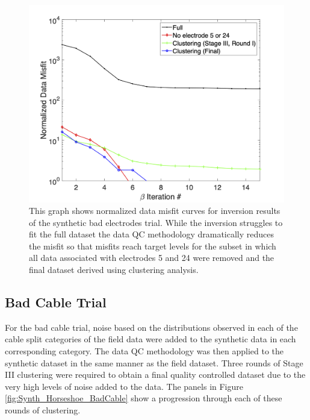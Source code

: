 \documentclass[final,authoryear,5p,times,twocolumn]{elsarticle}
\begin{document}
\begin{figure} [!ht]
	\begin{center}
	\includegraphics[trim=1.3cm 0.2cm 2.6cm 1.2cm, clip=true,width=0.75\linewidth]{./Figures/Fig22.png}
	\end{center}
\caption{This graph shows normalized data misfit curves for inversion results of the synthetic bad electrodes trial. While the inversion struggles to fit the full dataset the data QC methodology dramatically reduces the misfit so that misfits reach target levels for the subset in which all data associated with electrodes 5 and 24 were removed and the final dataset derived using clustering analysis.}
\label{fig:Synth_Horseshoe_BadElec_MisfitPlots}
\end{figure}

\subsection{Bad Cable Trial}

For the bad cable trial, noise based on the distributions observed in each of the cable split categories of the field data were added to the synthetic data in each corresponding category. The data QC methodology was then applied to the synthetic dataset in the same manner as the field dataset. Three rounds of Stage III clustering were required to obtain a final quality controlled dataset due to the very high levels of noise added to the data. The panels in Figure \ref{fig:Synth_Horseshoe_BadCable} show a progression through each of these rounds of clustering.
\end{document}
